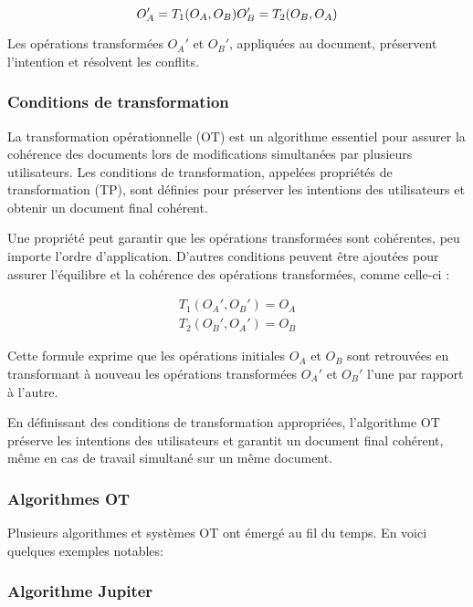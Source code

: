 \begin{equation}
O_A' = T_1(O_A, O_B) \\
O_B' = T_2(O_B, O_A)
\end{equation}

Les opérations transformées $O_A'$ et $O_B'$, appliquées au document, préservent l'intention et résolvent les conflits.

\subsubsection{Conditions de transformation}

La transformation opérationnelle (OT) est un algorithme essentiel pour assurer la cohérence des documents lors de modifications simultanées par plusieurs utilisateurs. Les conditions de transformation, appelées propriétés de transformation (TP), sont définies pour préserver les intentions des utilisateurs et obtenir un document final cohérent.

Une propriété peut garantir que les opérations transformées sont cohérentes, peu importe l'ordre d'application. D'autres conditions peuvent être ajoutées pour assurer l'équilibre et la cohérence des opérations transformées, comme celle-ci :

\begin{equation}
\begin{aligned}
T_1(O_A', O_B') = O_A \\
T_2(O_B', O_A') = O_B
\end{aligned}
\end{equation}

Cette formule exprime que les opérations initiales $O_A$ et $O_B$ sont retrouvées en transformant à nouveau les opérations transformées $O_A'$ et $O_B'$ l'une par rapport à l'autre.

En définissant des conditions de transformation appropriées, l'algorithme OT préserve les intentions des utilisateurs et garantit un document final cohérent, même en cas de travail simultané sur un même document.
\subsubsection{Algorithmes OT}

Plusieurs algorithmes et systèmes OT ont émergé au fil du temps. En voici quelques exemples notables:

\subsubsection{Algorithme Jupiter}


